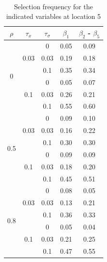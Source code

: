 \documentclass[authoryear, review, 11pt]{elsarticle}
\begin{document}
	
		\begin{table}[ht]
		\begin{center}
		\begin{tabular}{ccc|cc}
		$\rho$ & $\tau_x$ & $\tau_\sigma$ &  $\beta_1$ & $\beta_2$ - $\beta_5$ \\ 
		  \hline
		\multirow{6}{*}{0} & \multirow{3}{*}{0.03} & 0 & 0.05 & 0.09 \\ 
		 &  & 0.03 &   0.19 & 0.18 \\ 
		 &  & 0.1 &   0.35 & 0.34 \\ \cline{2-5}
		 & \multirow{3}{*}{0.1} & 0 &   0.05 & 0.07 \\ 
		 &  & 0.03 &   0.26 & 0.21 \\ 
		 &  & 0.1 &   0.55 & 0.60 \\ \cline{1-5}
		\multirow{6}{*}{0.5} & \multirow{3}{*}{0.03} & 0 &   0.09 & 0.10 \\ 
		 &  & 0.03 &   0.16 & 0.22 \\ 
		 &  & 0.1 &   0.30 & 0.30 \\ \cline{2-5}
		 & \multirow{3}{*}{0.1} & 0 &   0.09 & 0.09 \\ 
		 &  & 0.03 &   0.18 & 0.20 \\ 
		 &  & 0.1 &   0.45 & 0.51 \\ \cline{1-5}
		\multirow{6}{*}{0.8} & \multirow{3}{*}{0.03} & 0 &   0.08 & 0.05 \\ 
		 &  & 0.03 &   0.13 & 0.21 \\ 
		 &  & 0.1 &   0.36 & 0.33 \\ \cline{2-5}
		 & \multirow{3}{*}{0.1} & 0 &   0.05 & 0.04 \\ 
		 &  & 0.03 &   0.21 & 0.25 \\ 
		 &  & 0.1 &   0.47 & 0.55 \\ 
		  \end{tabular}
		\caption{Selection frequency for the indicated variables at location 5\label{table:loc5-selection}}
		\end{center}
		\end{table}
\end{document}
